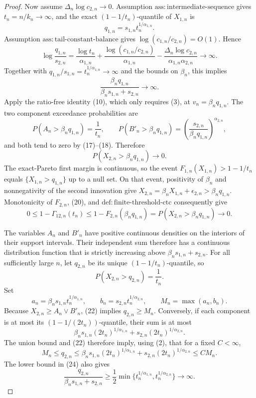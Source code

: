 \documentclass{article}
\begin{document}
\begin{proof}
Now assume \(\Delta_n\log c_{2,n}\to0\). Assumption \(\mathrm{ass{:}intermediate\text{-}sequence}\) gives \(t_n=n/k_n\to\infty\), and the exact \((1-1/t_n)\)-quantile of \(X_{1,n}\) is
\[
q_{1,n}=s_{1,n}t_n^{1/\alpha_{1,n}}.
\tag{16}
\]
Assumption \(\mathrm{ass{:}tail\text{-}constant\text{-}balance}\) gives \(\log(c_{1,n}/c_{2,n})=O(1)\). Hence
\[
\log\frac{q_{1,n}}{s_{2,n}}
=\frac{\log t_n}{\alpha_{1,n}}
+\frac{\log(c_{1,n}/c_{2,n})}{\alpha_{1,n}}
-\frac{\Delta_n\log c_{2,n}}{\alpha_{1,n}\alpha_{2,n}}
\longrightarrow\infty.
\tag{17}
\]
Together with \(q_{1,n}/s_{1,n}=t_n^{1/\alpha_{1,n}}\to\infty\) and the bounds on \(\beta_n\), this implies
\[
\frac{\beta_nq_{1,n}}{\beta_ns_{1,n}+s_{2,n}}\to\infty.
\tag{18}
\]
Apply the ratio-free identity (10), which only requires (3), at \(v_n=\beta_nq_{1,n}\). The two component exceedance probabilities are
\[
P(A_n>\beta_nq_{1,n})=\frac1{t_n},
\qquad
P(B'_n>\beta_nq_{1,n})
=\left(\frac{s_{2,n}}{\beta_nq_{1,n}}\right)^{\alpha_{2,n}},
\tag{19}
\]
and both tend to zero by (17)--(18). Therefore
\[
P(X_{2,n}>\beta_nq_{1,n})\to0.
\tag{20}
\]
The exact-Pareto first margin is continuous, so the event \(F_{1,n}(X_{1,n})>1-1/t_n\) equals \(\{X_{1,n}>q_{1,n}\}\) up to a null set. On that event, positivity of \(\beta_n\) and nonnegativity of the second innovation give \(X_{2,n}=\beta_nX_{1,n}+\epsilon_{2,n}>\beta_nq_{1,n}\). Monotonicity of \(F_{2,n}\), (20), and \(\mathrm{def{:}finite\text{-}threshold\text{-}ctc}\) consequently give
\[
0\leq1-\Gamma_{12,n}(t_n)
\leq1-F_{2,n}(\beta_nq_{1,n})
=P(X_{2,n}>\beta_nq_{1,n})\to0.
\tag{21}
\]

The variables \(A_n\) and \(B'_n\) have positive continuous densities on the interiors of their support intervals. Their independent sum therefore has a continuous distribution function that is strictly increasing above \(\beta_ns_{1,n}+s_{2,n}\). For all sufficiently large \(n\), let \(q_{2,n}\) be its unique \((1-1/t_n)\)-quantile, so
\[
P(X_{2,n}>q_{2,n})=\frac1{t_n}.
\tag{22}
\]
Set
\[
a_n=\beta_ns_{1,n}t_n^{1/\alpha_{1,n}},
\qquad b_n=s_{2,n}t_n^{1/\alpha_{2,n}},
\qquad M_n=\max(a_n,b_n).
\tag{23}
\]
Because \(X_{2,n}\geq A_n\vee B'_n\), (22) implies \(q_{2,n}\geq M_n\). Conversely, if each component is at most its \((1-1/(2t_n))\)-quantile, their sum is at most
\[
\beta_ns_{1,n}(2t_n)^{1/\alpha_{1,n}}
+s_{2,n}(2t_n)^{1/\alpha_{2,n}}.
\]
The union bound and (22) therefore imply, using (2), that for a fixed \(C<\infty\),
\[
M_n\leq q_{2,n}
\leq\beta_ns_{1,n}(2t_n)^{1/\alpha_{1,n}}
+s_{2,n}(2t_n)^{1/\alpha_{2,n}}
\leq CM_n.
\tag{24}
\]
The lower bound in (24) also gives
\[
\frac{q_{2,n}}{\beta_ns_{1,n}+s_{2,n}}
\geq\frac12\min\{t_n^{1/\alpha_{1,n}},t_n^{1/\alpha_{2,n}}\}
\longrightarrow\infty.
\tag{25}
\]


\end{proof}
\end{document}

